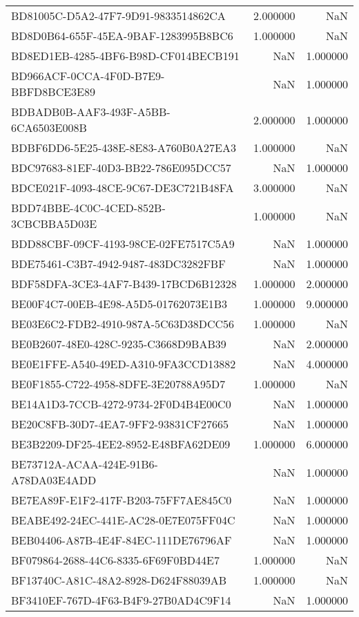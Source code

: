 \begin{tabular}{lrr}
BD81005C-D5A2-47F7-9D91-9833514862CA & 2.000000 & NaN \\
BD8D0B64-655F-45EA-9BAF-1283995B8BC6 & 1.000000 & NaN \\
BD8ED1EB-4285-4BF6-B98D-CF014BECB191 & NaN & 1.000000 \\
BD966ACF-0CCA-4F0D-B7E9-BBFD8BCE3E89 & NaN & 1.000000 \\
BDBADB0B-AAF3-493F-A5BB-6CA6503E008B & 2.000000 & 1.000000 \\
BDBF6DD6-5E25-438E-8E83-A760B0A27EA3 & 1.000000 & NaN \\
BDC97683-81EF-40D3-BB22-786E095DCC57 & NaN & 1.000000 \\
BDCE021F-4093-48CE-9C67-DE3C721B48FA & 3.000000 & NaN \\
BDD74BBE-4C0C-4CED-852B-3CBCBBA5D03E & 1.000000 & NaN \\
BDD88CBF-09CF-4193-98CE-02FE7517C5A9 & NaN & 1.000000 \\
BDE75461-C3B7-4942-9487-483DC3282FBF & NaN & 1.000000 \\
BDF58DFA-3CE3-4AF7-B439-17BCD6B12328 & 1.000000 & 2.000000 \\
BE00F4C7-00EB-4E98-A5D5-01762073E1B3 & 1.000000 & 9.000000 \\
BE03E6C2-FDB2-4910-987A-5C63D38DCC56 & 1.000000 & NaN \\
BE0B2607-48E0-428C-9235-C3668D9BAB39 & NaN & 2.000000 \\
BE0E1FFE-A540-49ED-A310-9FA3CCD13882 & NaN & 4.000000 \\
BE0F1855-C722-4958-8DFE-3E20788A95D7 & 1.000000 & NaN \\
BE14A1D3-7CCB-4272-9734-2F0D4B4E00C0 & NaN & 1.000000 \\
BE20C8FB-30D7-4EA7-9FF2-93831CF27665 & NaN & 1.000000 \\
BE3B2209-DF25-4EE2-8952-E48BFA62DE09 & 1.000000 & 6.000000 \\
BE73712A-ACAA-424E-91B6-A78DA03E4ADD & NaN & 1.000000 \\
BE7EA89F-E1F2-417F-B203-75FF7AE845C0 & NaN & 1.000000 \\
BEABE492-24EC-441E-AC28-0E7E075FF04C & NaN & 1.000000 \\
BEB04406-A87B-4E4F-84EC-111DE76796AF & NaN & 1.000000 \\
BF079864-2688-44C6-8335-6F69F0BD44E7 & 1.000000 & NaN \\
BF13740C-A81C-48A2-8928-D624F88039AB & 1.000000 & NaN \\
BF3410EF-767D-4F63-B4F9-27B0AD4C9F14 & NaN & 1.000000 \\

\end{tabular}
